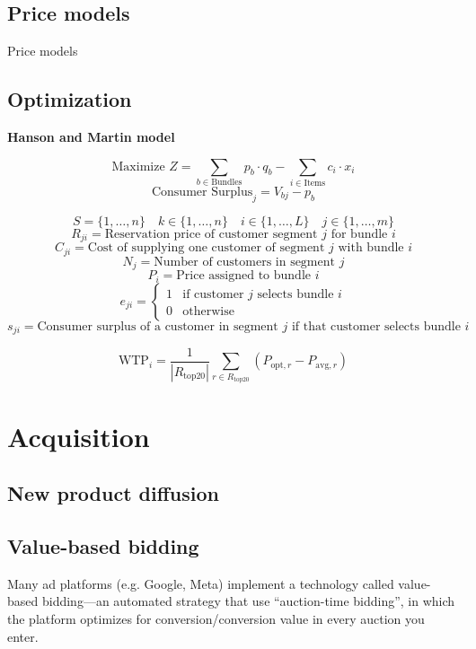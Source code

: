 \documentclass{article}
\begin{document}
\subsection{Price models}

Price models 

\subsection{Optimization}

\textbf{Hanson and Martin model}

\[
\text{Maximize } Z = \sum_{b \in \text{Bundles}} p_b \cdot q_b - \sum_{i \in \text{Items}} c_i \cdot x_i
\]
\[
\text{Consumer Surplus}_j = V_{bj} - p_b
\]

\[
S = \{1, \ldots, n\} \quad k \in \{1, \ldots, n\} \quad i \in \{1, \ldots, L\} \quad j \in \{1, \ldots, m\}
\]
\[
R_{ji} = \text{Reservation price of customer segment } j \text{ for bundle } i
\]
\[
C_{ji} = \text{Cost of supplying one customer of segment } j \text{ with bundle } i
\]
\[
N_j = \text{Number of customers in segment } j
\]
\[
P_i = \text{Price assigned to bundle } i
\]
\[
e_{ji} = 
\begin{cases} 
1 & \text{if customer } j \text{ selects bundle } i \\
0 & \text{otherwise} 
\end{cases}
\]
\[
s_{ji} = \text{Consumer surplus of a customer in segment } j \text{ if that customer selects bundle } i
\]



\[
\text{WTP}_i = \frac{1}{|R_{\text{top20}}|} \sum_{r \in R_{\text{top20}}} \left( P_{\text{opt}, r} - P_{\text{avg}, r} \right)
\]






\section{Acquisition}

\subsection{New product diffusion}

\subsection{Value-based bidding}

Many ad platforms (e.g. Google, Meta) implement a technology called value-based bidding—an automated strategy that use “auction-time bidding”, in which the platform optimizes for conversion/conversion value in every auction you enter.
\end{document}
